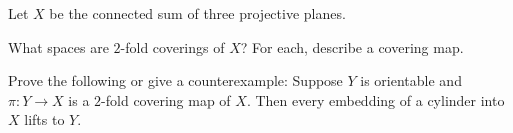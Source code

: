 Let $X$ be the connected sum of three projective planes.
\begin{alist}
\item What spaces are $2$-fold coverings of $X$? For each, describe
a covering map.
\item Prove the following or give a counterexample: Suppose $Y$ 
is orientable and $\pi:Y\rightarrow X$ is a $2$-fold covering map of
$X$. Then every embedding of a cylinder into $X$ lifts to $Y$.
\end{alist}
